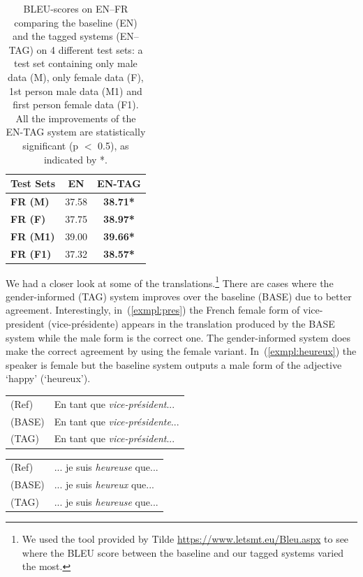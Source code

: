 \begin{table}[h!]
\centering
\footnotesize\begin{tabular}{|l|c|c|}
\hline
\bf{Test Sets}	    &	\bf{EN}		&	\bf{EN-TAG}	        \\	\hline
\bf{FR (M)}		    &	37.58		&	\bf{38.71*}	 	    \\	\hline
\bf{FR (F)} 		&	37.75	    &	\bf{38.97*}  	    \\	\hline
\bf{FR (M1)}	    &	39.00	    &	\bf{39.66*}	 	    \\	\hline
\bf{FR (F1)}		&	37.32		&	\bf{38.57*}   	 	\\ \hline
\end{tabular}
\caption{BLEU-scores on EN--FR comparing the baseline (EN) and the tagged systems (EN--TAG) on 4 different test sets: a test set containing only male data (M), only female data (F), 1st person male data (M1) and first person female data (F1). All the improvements of the EN-TAG system are statistically significant (p $<$ 0.5), as indicated by *.}\label{tbl:testsets}
\end{table}

We had a closer look at some of the translations.\footnote{We used the tool provided by Tilde \url{https://www.letsmt.eu/Bleu.aspx} to see where the BLEU score between the baseline and our tagged systems varied the most.} There are cases where the gender-informed (TAG) system improves over the baseline (BASE) due to better agreement. Interestingly, in~(\ref{exmpl:pres}) the French female form of vice-president (vice-pr\'{e}sidente) appears in the translation produced by the BASE system while the male form is the correct one. The gender-informed system does make the correct agreement by using the female variant. In~(\ref{exmpl:heureux}) the speaker is female but the baseline system outputs a male form of the adjective `happy' (`heureux'). 

\begin{li}
{\small \centering
\begin{tabular}{ll}
(Ref) & En tant que \emph{vice-pr\'{e}sident}...\\
(BASE) & En tant que \emph{vice-pr\'{e}sidente}...\\
(TAG) & En tant que \emph{vice-pr\'{e}sident}...\\
\end{tabular}}\label{exmpl:pres}
\end{li}

\begin{li}
{\small \centering
\begin{tabular}{ll}
(Ref) & ... je suis \emph{heureuse} que...\\
(BASE) & ... je suis \emph{heureux} que...\\
(TAG) & ... je suis \emph{heureuse} que...\\
\end{tabular}}\label{exmpl:heureux}
\end{li}

